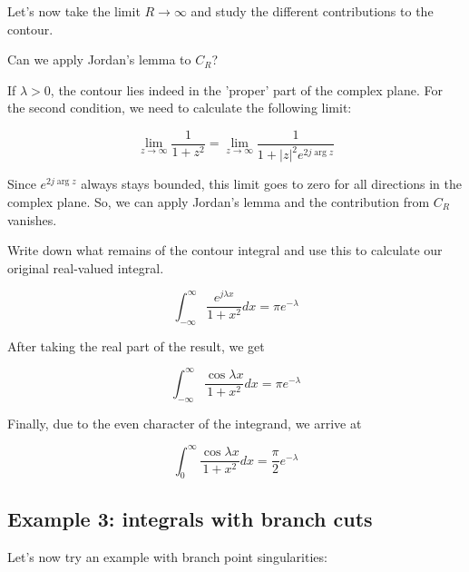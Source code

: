 Let's now take the limit $R \to \infty$ and study the different contributions to the contour.

\begin{cue}
  Can we apply Jordan's lemma to ${C_R}$? 
\end{cue}

If $\lambda > 0$, the contour lies indeed in the 'proper' part of the complex plane. For the second condition, we need to calculate the following limit:

\begin{equation}
\lim_{z \to \infty}\frac{1}{1+z^2} = \lim_{z \to \infty}\frac{1}{1+|z|^2 e^{2 j
\arg z}}
\end{equation}

Since $e^{2 j \arg z}$ always stays bounded, this limit goes to zero for all directions in the complex plane. So, we can apply Jordan's lemma and the contribution from ${C_R}$ vanishes.

\begin{cue}
Write down what remains of the contour integral and use this to calculate our original real-valued integral.
\end{cue}

\begin{equation}
\int_{-\infty}^{\infty}\frac{e^{j \lambda x}}{1 + x^2} dx = \pi e^{-\lambda}
\end{equation}

\noindent{}After taking the real part of the result, we get

\begin{equation}
\int_{-\infty}^{\infty}\frac{\cos \lambda x}{1 + x^2} dx = \pi e^{-\lambda}
\end{equation}

Finally, due to the even character of the integrand, we arrive at

\begin{equation}
\int_0^{\infty}\frac{\cos \lambda x}{1 + x^2} dx = \frac{\pi}{2} e^{-\lambda}
\end{equation}

\subsection*{Example 3: integrals with branch cuts}

Let's now try an example with branch point singularities:


